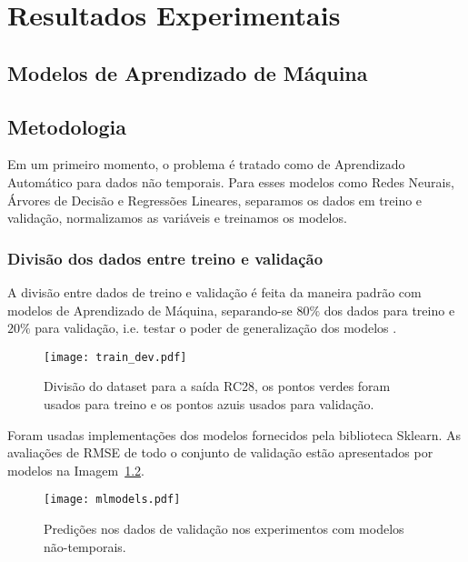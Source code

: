\chapter{ Resultados Experimentais }
\label{cap:resultados}



\section{Modelos de Aprendizado de Máquina}



\section{Metodologia}

Em um primeiro momento, o problema é tratado como de Aprendizado Automático para
dados não temporais. Para esses modelos como Redes Neurais, Árvores de Decisão e Regressões
Lineares, separamos os dados em treino e validação, normalizamos as variáveis e treinamos os modelos. 

\subsection{Divisão dos dados entre treino e validação}


A divisão entre dados de treino e validação é feita da maneira padrão com
modelos de Aprendizado de Máquina, separando-se $80\%$ dos dados para treino e
$20\%$ para validação, i.e. testar o poder de generalização dos modelos \cite{mlbook}.

\begin{figure}[H]
  \centering
  \texttt{[image: train\_dev.pdf]}
  \caption{Divisão do dataset para a saída RC28, os pontos verdes foram usados para
    treino e os pontos azuis usados para validação.}
  \label{fig:divrc28}
\end{figure}

Foram usadas implementações dos modelos fornecidos pela biblioteca Sklearn.
As avaliações de RMSE de todo o conjunto de validação estão apresentados por modelos na Imagem~\ref{fig:mlmodels}.  

\begin{figure}[H]
  \centering
\texttt{[image: mlmodels.pdf]}
\caption{Predições nos dados de validação nos experimentos com modelos não-temporais. }
\label{fig:mlmodels}
\end{figure}

